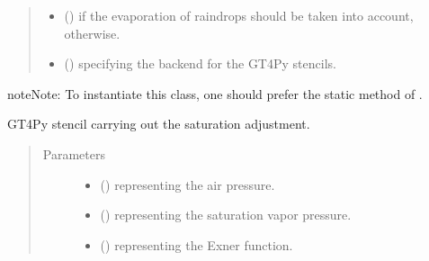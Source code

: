 \documentclass[letterpaper,10pt,english]{sphinxmanual}
\begin{document}
\begin{fulllineitems}
\begin{fulllineitems}
\begin{quote}
\begin{description}
\begin{itemize}
\item {} 
 () \textendash{}  if the evaporation of raindrops should be taken into account,  otherwise.

\item {} 
 () \textendash{}  specifying the backend for the GT4Py stencils.

\end{itemize}

\end{description}\end{quote}

\begin{sphinxadmonition}{note}{Note:}
To instantiate this class, one should prefer the static method
 of
.
\end{sphinxadmonition}

\end{fulllineitems}


\begin{fulllineitems}
\label{\detokenize{api:parameterizations.adjustment_microphysics_kessler_wrf_saturation.AdjustmentMicrophysicsKesslerWRFSaturation._stencil_adjustment_defs}}
GT4Py stencil carrying out the saturation adjustment.
\begin{quote}\begin{description}
\item[{Parameters}] \leavevmode\begin{itemize}
\item {} 
 () \textendash{}  representing the air pressure.

\item {} 
 () \textendash{}  representing the saturation vapor pressure.

\item {} 
 () \textendash{}  representing the Exner function.


\end{itemize}
\end{description}
\end{quote}
\end{fulllineitems}
\end{fulllineitems}
\end{document}
